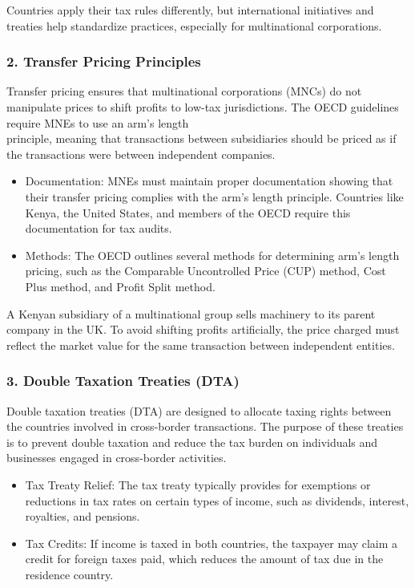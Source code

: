 \documentclass[10pt]{article}
\begin{document}
Countries apply their tax rules differently, but international initiatives and treaties help standardize practices, especially for multinational corporations.

\subsubsection*{2. Transfer Pricing Principles}
Transfer pricing ensures that multinational corporations (MNCs) do not manipulate prices to shift profits to low-tax jurisdictions. The OECD guidelines require MNEs to use an arm's length\\
principle, meaning that transactions between subsidiaries should be priced as if the transactions were between independent companies.

\begin{itemize}
  \item Documentation: MNEs must maintain proper documentation showing that their transfer pricing complies with the arm's length principle. Countries like Kenya, the United States, and members of the OECD require this documentation for tax audits.
  \item Methods: The OECD outlines several methods for determining arm's length pricing, such as the Comparable Uncontrolled Price (CUP) method, Cost Plus method, and Profit Split method.
\end{itemize}

\begin{example}
	A Kenyan subsidiary of a multinational group sells machinery to its parent company in the UK. To avoid shifting profits artificially, the price charged must reflect the market value for the same transaction between independent entities.
\end{example}


\subsubsection*{3. Double Taxation Treaties (DTA)}
Double taxation treaties (DTA) are designed to allocate taxing rights between the countries involved in cross-border transactions. The purpose of these treaties is to prevent double taxation and reduce the tax burden on individuals and businesses engaged in cross-border activities.

\begin{itemize}
  \item Tax Treaty Relief: The tax treaty typically provides for exemptions or reductions in tax rates on certain types of income, such as dividends, interest, royalties, and pensions.
  \item Tax Credits: If income is taxed in both countries, the taxpayer may claim a credit for foreign taxes paid, which reduces the amount of tax due in the residence country.
\end{itemize}
\end{document}
